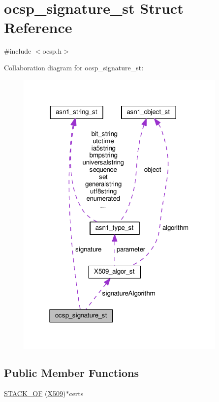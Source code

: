 \hypertarget{structocsp__signature__st}{}\section{ocsp\+\_\+signature\+\_\+st Struct Reference}
\label{structocsp__signature__st}


{\ttfamily \#include $<$ocsp.\+h$>$}



Collaboration diagram for ocsp\+\_\+signature\+\_\+st\+:
\nopagebreak
\begin{figure}[H]
\begin{center}
\leavevmode
\includegraphics[width=292pt]{structocsp__signature__st__coll__graph}
\end{center}
\end{figure}
\subsection*{Public Member Functions}
\begin{DoxyCompactItemize}
\item 
\hyperlink{structocsp__signature__st_adc334555122689e65ef7a051a0eb681e}{S\+T\+A\+C\+K\+\_\+\+OF} (\hyperlink{ossl__typ_8h_a4f666bde6518f95deb3050c54b408416}{X509})$\ast$certs
\end{DoxyCompactItemize}
